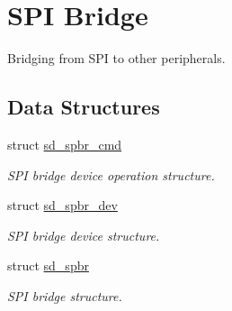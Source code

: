 \hypertarget{group___s_d___s_p_i___bridge}{}\section{S\+PI Bridge}
\label{group___s_d___s_p_i___bridge}


Bridging from S\+PI to other peripherals.  


\subsection*{Data Structures}
\begin{DoxyCompactItemize}
\item 
struct \mbox{\hyperlink{structsd__spbr__cmd}{sd\+\_\+spbr\+\_\+cmd}}
\begin{DoxyCompactList}\small\item\em S\+PI bridge device operation structure. \end{DoxyCompactList}\item 
struct \mbox{\hyperlink{structsd__spbr__dev}{sd\+\_\+spbr\+\_\+dev}}
\begin{DoxyCompactList}\small\item\em S\+PI bridge device structure. \end{DoxyCompactList}\item 
struct \mbox{\hyperlink{structsd__spbr}{sd\+\_\+spbr}}
\begin{DoxyCompactList}\small\item\em S\+PI bridge structure. \end{DoxyCompactList}\end{DoxyCompactItemize}
